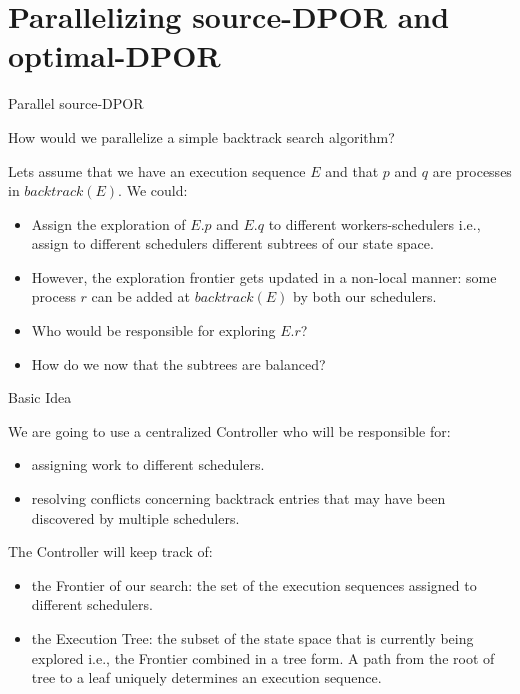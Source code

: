 \documentclass[9pt]{beamer}
\begin{document}
\section{Parallelizing source-DPOR and optimal-DPOR}

\begin{frame} {Parallel source-DPOR}

How would we parallelize a simple backtrack search algorithm?

Lets assume that we have an execution sequence $E$ and that $p$ and $q$ are processes in $backtrack(E)$. We could:

\begin{itemize}
  \item Assign the exploration of $E.p$ and $E.q$ to different workers-schedulers i.e., assign to different schedulers different 
  subtrees of our state space.
  \item However, the exploration frontier gets updated in a non-local manner: some process $r$ can be added
  at $backtrack(E)$ by both our schedulers.
  \item Who would be responsible for exploring $E.r$?
  \item How do we now that the subtrees are balanced?
\end{itemize}
 
\end{frame}

\begin{frame} {Basic Idea}

We are going to use a centralized Controller who will be responsible for:

\begin{itemize}
  \item assigning work to different schedulers.
  \item resolving conflicts concerning backtrack entries that may have been discovered by multiple schedulers.
\end{itemize}

The Controller will keep track of:

\begin{itemize}
  \item the Frontier of our search: the set of the execution sequences assigned to different schedulers.
  \item the Execution Tree: the subset of the state space that is currently being explored i.e., the Frontier combined in a tree form.
  A path from the root of tree to a leaf uniquely determines an execution sequence.
\end{itemize}

\end{frame}
\end{document}
